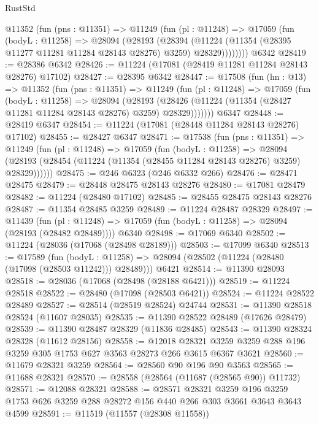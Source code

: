 \begin{lexlean}{RustStd}
\begin{coremodule}
      @11352
        (fun (pns : @11351) =>
        @11249
          (fun (pl : @11248) =>
          @17059
            (fun (bodyL : @11258) =>
            @28094
              (@28193
                (@28394
                  (@11224 (@11354 (@28395 @11277 @11281 @11284 @28143 @28276) @3259) @28329))))))))
    @6342
@28419 := @28386 @6342
@28426 := @11224 (@17081 (@28419 @11281 @11284 @28143 @28276) @17102)
@28427 := @28395 @6342
@28447 := @17508
    (fun (hn : @13) =>
    @11352
      (fun (pns : @11351) =>
      @11249
        (fun (pl : @11248) =>
        @17059
          (fun (bodyL : @11258) =>
          @28094
            (@28193
              (@28426 (@11224 (@11354 (@28427 @11281 @11284 @28143 @28276) @3259) @28329)))))))
    @6347
@28448 := @28419 @6347
@28454 := @11224 (@17081 (@28448 @11284 @28143 @28276) @17102)
@28455 := @28427 @6347
@28471 := @17538
    (fun (pns : @11351) =>
    @11249
      (fun (pl : @11248) =>
      @17059
        (fun (bodyL : @11258) =>
        @28094 (@28193 (@28454 (@11224 (@11354 (@28455 @11284 @28143 @28276) @3259) @28329))))))
@28475 := @246 @6323 (@246 @6332 @266)
@28476 := @28471 @28475
@28479 := @28448 @28475 @28143 @28276
@28480 := @17081 @28479
@28482 := @11224 (@28480 @17102)
@28485 := @28455 @28475 @28143 @28276
@28487 := @11354 @28485 @3259
@28489 := @11224 @28487 @28329
@28497 := @11439
    (fun (pl : @11248) => @17059 (fun (bodyL : @11258) => @28094 (@28193 (@28482 @28489))))
    @6340
@28498 := @17069 @6340
@28502 := @11224 (@28036 (@17068 (@28498 @28189)))
@28503 := @17099 @6340
@28513 := @17589
    (fun (bodyL : @11258) => @28094 (@28502 (@11224 (@28480 (@17098 (@28503 @11242))) @28489)))
    @6421
@28514 := @11390 @28093
@28518 := @28036 (@17068 (@28498 (@28188 @6421)))
@28519 := @11224 @28518
@28522 := @28480 (@17098 (@28503 @6421))
@28524 := @11224 @28522 @28489
@28527 := @28514 (@28519 @28524) @24744
@28531 := @11390 @28518 @28524 (@11607 @28035)
@28535 := @11390 @28522 @28489 (@17626 @28479)
@28539 := @11390 @28487 @28329 (@11836 @28485)
@28543 := @11390 @28324 @28328 (@11612 @28156)
@28558 := @12018
    @28321
    @3259
    @3259
    @288
    @196
    @3259
    @305
    @1753
    @627
    @3563
    @28273
    @266
    @3615
    @6367
    @3621
@28560 := @11679 @28321 @3259
@28564 := @28560 @90 @196 @90 @3563
@28565 := @11688 @28321
@28570 := @28558 (@28564 (@11687 (@28565 @90)) @11732)
@28571 := @12088 @28321
@28588 := @28571
    @28321
    @3259
    @196
    @3259
    @1753
    @626
    @3259
    @288
    @28272
    @156
    @440
    @266
    @303
    @3661
    @3643
    @3643
    @4599
@28591 := @11519 (@11557 (@28308 @11558))

\end{coremodule}
\end{lexlean}
